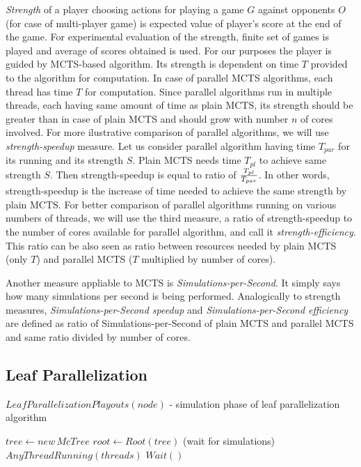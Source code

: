\emph{Strength} of a player choosing actions for playing a game $G$ against
opponents $O$ (for case of multi-player game) 
is expected value of player's score at the end of the game. For experimental evaluation of the
strength, finite set of games is played and average
 of scores obtained is used. For our
purposes the player is guided by MCTS-based algorithm. Its strength is dependent on time $T$
provided to the algorithm for computation. In case of parallel MCTS algorithms, each thread has
time $T$ for computation. Since parallel algorithms run in multiple threads, each having same
amount of time as plain MCTS, its strength should be greater than in case of plain MCTS and should 
grow with number $n$ of cores involved. For more ilustrative comparison of parallel algorithms,
we will use \emph{strength-speedup} measure. Let us consider parallel algorithm having time
$T_{par}$
for its running and its strength $S$. Plain MCTS needs time $T_{pl}$ to achieve same strength
$S$. Then strength-speedup is equal to ratio of $T_{pl} \over T_{par}$. In other words,
strength-speedup is the increase of time needed to achieve the same strength by plain MCTS.
For better comparison of parallel algorithms running on various numbers of threads, we will use 
the third measure, a ratio of strength-speedup to the number of cores available for parallel
algorithm, and call it \emph{strength-efficiency}. This ratio can be also seen as ratio between
resources needed by plain MCTS (only $T$) and parallel MCTS ($T$ multiplied by number of
cores).

Another measure appliable to MCTS is \emph{Simulations-per-Second}. It simply says how many
simulations per second is being performed. Analogically to strength measures,
\emph{Simulations-per-Second speedup} and \emph{Simulations-per-Second efficiency} are defined
as ratio of Simulations-per-Second of plain MCTS and parallel MCTS and same ratio divided by
number of cores. 


\subsection{Leaf Parallelization}
\label{sec_leaf_parallelization}

\begin{algorithm}
\DontPrintSemicolon
\caption{$LeafParallelizationPlayouts(node)$ - simulation phase of leaf parallelization
algorithm}
\label{alg_leaf_parallelization}

$tree \leftarrow new\,McTree$ \;
$root \leftarrow Root(tree)$\;
\While(wait for simulations){$AnyThreadRunning(threads)$}{
    $Wait()$\;
}
\end{algorithm}

